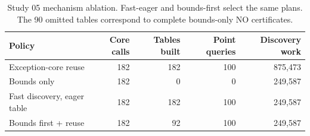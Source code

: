 \begin{table}[htbp]
\centering\small
\begin{tabular}{@{}lrrrr@{}}
\toprule
Policy & Core calls & Tables built & Point queries & Discovery work \\
\midrule
Exception-core reuse & 182 & 182 & 100 & 875,473 \\
Bounds only & 182 & 0 & 0 & 249,587 \\
Fast discovery, eager table & 182 & 182 & 100 & 249,587 \\
Bounds first + reuse & 182 & 92 & 100 & 249,587 \\
\bottomrule
\end{tabular}
\caption{Study 05 mechanism ablation. Fast-eager and bounds-first select the same plans. The 90 omitted tables correspond to complete bounds-only NO certificates.}
\label{tab:ablation}
\end{table}
